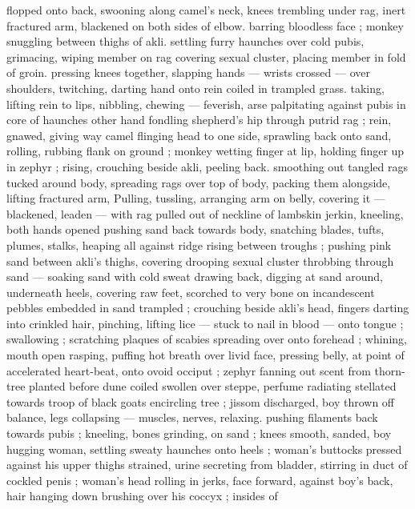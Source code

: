 flopped onto back, swooning along camel's neck, knees trembling 
under rag, inert fractured arm, blackened on both sides of elbow. 
barring bloodless face ; monkey snuggling between thighs of akli. 
settling furry haunches over cold pubis, grimacing, wiping member 
on rag covering sexual cluster, placing member in fold of groin. 
pressing knees together, slapping hands --- wrists crossed --- over 
shoulders, twitching, darting hand onto rein coiled in trampled grass. 
taking, lifting rein to lips, nibbling, chewing --- feverish, arse 
palpitating against pubis in core of haunches {\dashcom} other hand 
fondling shepherd's hip through putrid rag ; rein, gnawed, giving way 
{\col} camel flinging head to one side, sprawling back onto sand, rolling, 
rubbing flank on ground ; monkey wetting finger at lip, holding finger 
up in zephyr ; rising, crouching beside akli, peeling back. smoothing 
out tangled rags tucked around body, spreading rags over top of 
body, packing them alongside, lifting fractured arm, Pulling, tussling, 
arranging arm on belly, covering it --- blackened, leaden --- with rag 
pulled out of neckline of lambskin jerkin, kneeling, both hands 
opened pushing sand back towards body, snatching blades, tufts, 
plumes, stalks, heaping all against ridge rising between troughs ;
pushing pink sand between akli's thighs, covering drooping sexual 
cluster throbbing through sand --- soaking sand with cold sweat {\dashcom}
drawing back, digging at sand around, underneath heels, covering 
raw feet, scorched to very bone on incandescent pebbles embedded 
in sand trampled ; crouching beside akli's head, fingers darting into 
crinkled hair, pinching, lifting lice --- stuck to nail in blood --- onto 
tongue ; swallowing ; scratching plaques of scabies spreading over 
onto forehead ; whining, mouth open rasping, puffing hot breath 
over livid face, pressing belly, at point of accelerated heart-beat, 
onto ovoid occiput ; zephyr fanning out scent from thorn-tree planted 
before dune coiled swollen over steppe, perfume radiating stellated 
towards troop of black goats encircling tree ; jissom discharged, boy 
thrown off balance, legs collapsing --- muscles, nerves, relaxing. 
pushing filaments back towards pubis ; kneeling, bones grinding, on 
sand ; knees smooth, sanded, boy hugging woman, settling sweaty 
haunches onto heels ; woman's buttocks pressed against his upper 
thighs strained, urine secreting from bladder, stirring in duct of 
cockled penis ; woman's head rolling in jerks, face forward, against 
boy's back, hair hanging down brushing over his coccyx ; insides of 

